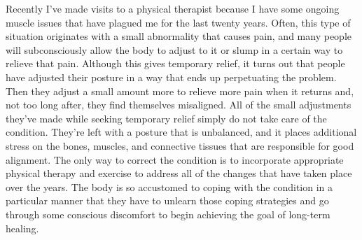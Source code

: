 Recently I've made visits to a physical therapist because I have some 
ongoing muscle issues that have plagued me for the last twenty years. 
Often, this type of situation originates with a small abnormality that 
causes pain, and many people will subconsciously allow the body to 
adjust to it or slump in a certain way to relieve that pain. Although 
this gives temporary relief, it turns out that people have adjusted 
their posture in a way that ends up perpetuating the problem. Then they 
adjust a small amount more to relieve more pain when it returns and, 
not too long after, they find themselves misaligned. All of the small 
adjustments they've made while seeking temporary relief simply do not 
take care of the condition. They're left with a posture that is 
unbalanced, and it places additional stress on the bones, muscles, and 
connective tissues that are responsible for good alignment. The only 
way to correct the condition is to incorporate appropriate physical 
therapy and exercise to address all of the changes that have taken 
place over the years. The body is so accustomed to coping with the 
condition in a particular manner that they have to unlearn those coping 
strategies and go through some conscious discomfort to begin achieving 
the goal of long-term healing.


